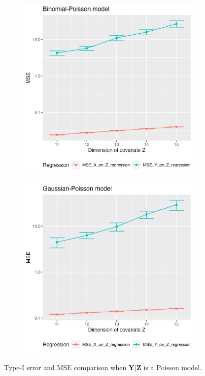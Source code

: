 \documentclass{article}
\begin{document}
\begin{figure}[ht]
    \begin{subfigure}{0.5\textwidth}
        \centering
        \includegraphics[width=\linewidth]{Figures/Q2/MSE-binomial-poisson.png}
    \end{subfigure}%
    \begin{subfigure}{0.5\textwidth}
        \centering
        \includegraphics[width=\linewidth]{Figures/Q2/MSE-gaussian-poisson.png}
    \end{subfigure}
    \caption{Type-I error and MSE comparison when $\bm Y|\bm Z$ is a $\mathrm{Poisson}$ model.}
    \label{fig:dCRT_GCM_asymmetry} 
\end{figure}


\newpage
{\scriptsize
\printbibliography
}

\newpage



\end{document}
